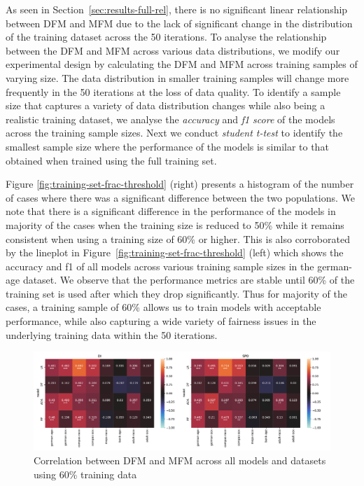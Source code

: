 \documentclass{article}
\begin{document}
As seen in Section \ref{sec:results-full-rel}, there is no significant
linear relationship between DFM and MFM due to the lack of significant
change in the distribution of the training dataset across the 50
iterations. To analyse the relationship between the DFM and MFM across
various data distributions, we modify our experimental design by
calculating the DFM and MFM across training samples of varying size.
The data distribution in smaller training samples will change more
frequently in the 50 iterations at the loss of data quality. To
identify a sample size that captures a variety of data distribution
changes while also being a realistic training dataset, we analyse the
\emph{accuracy} and \emph{f1 score} of the models across the training
sample sizes. Next we conduct \emph{student t-test} to identify the
smallest sample size where the performance of the models is similar to
that obtained when trained using the full training set.

Figure \ref{fig:training-set-frac-threshold} (right) presents
a histogram of the number of cases where there was a significant
difference between the two populations. We note that there is
a significant difference in the performance of the models in majority
of the cases when the training size is reduced to 50\% while it
remains consistent when using a training size of 60\% or higher. This
is also corroborated by the lineplot in
Figure \ref{fig:training-set-frac-threshold} (left) which shows the
accuracy and f1 of all models across various training sample sizes in
the german-age dataset. We observe that the performance metrics are
stable until 60\% of the training set is used after which they drop
significantly. Thus for majority of the cases, a training sample of
60\% allows us to train models with acceptable performance, while also
capturing a wide variety of fairness issues in the underlying training
data within the 50 iterations.

\begin{figure}
  \centering
  \includegraphics[width=0.95\linewidth]{heatmap--corr--training-sets-frac.pdf}
  \caption{Correlation between DFM and MFM across all models and
    datasets using 60\% training data}
  \label{fig:heatmap--corr--training-sets-frac}
\end{figure}
\end{document}

